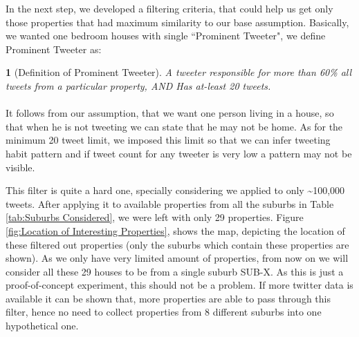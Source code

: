\documentclass[12pt]{report}
\theoremstyle{named}
\newtheorem*{namedtheorem}{}
\begin{document}
In the next step, we developed a filtering criteria, that could help us get only those properties that had maximum similarity to our base assumption. Basically, we wanted  one bedroom houses with single ``Prominent Tweeter", we define Prominent Tweeter as:


\begin{namedtheorem}[Definition of Prominent Tweeter] A tweeter responsible for more than 60\% all tweets from a particular property, AND Has at-least 20 tweets.
\end{namedtheorem}
\paragraph{}
It follows from our assumption, that we want one person living in a house, so that when he is not tweeting we can state that he may not be home. As for the minimum 20 tweet limit, we imposed this limit so that we can infer tweeting habit pattern and if tweet count for any tweeter is very low a pattern may not be visible.

This filter is quite a hard one, specially considering we applied to only \textasciitilde100,000 tweets. After applying it to available properties from all the suburbs in Table \ref{tab:Suburbs Considered}, we were left with only 29 properties. Figure \ref{fig:Location of Interesting Properties}, shows the map, depicting the location of these filtered out properties (only the suburbs which contain these properties are shown). As we only have very limited amount of properties, from now on we will consider all these 29 houses to be from a single suburb SUB-X. As this is just a proof-of-concept experiment, this should not be a problem. If more twitter data is available it can be shown that, more properties are able to pass through this filter, hence no need to collect properties from 8 different suburbs into one hypothetical one.
\end{document}
